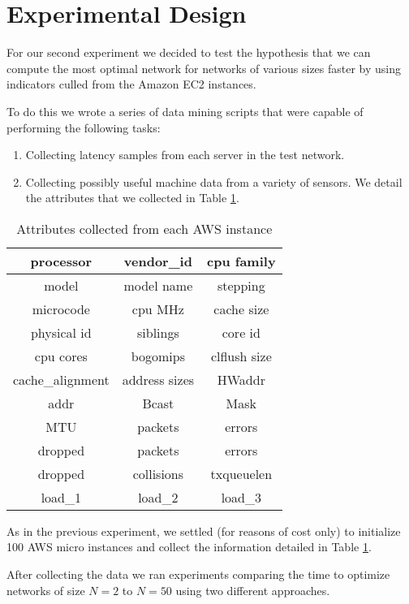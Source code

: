 \section{Experimental Design} \label{sec:experimental}
For our second experiment we decided to test the hypothesis that we can compute the most optimal network for networks of various sizes faster by using indicators culled from the Amazon EC2 instances.

To do this we wrote a series of data mining scripts that were capable of performing the following tasks:

\begin{enumerate}
\item Collecting latency samples from each server in the test network.
\item Collecting possibly useful machine data from a variety of sensors. We detail the attributes that we collected in Table \ref{table:dataset}.
\end{enumerate}

\begin{table}[h]
  \caption{Attributes collected from each AWS instance}
  \centering
  \begin{tabular}{ | c | c | c |}
    \hline
    processor   & vendor\_id & cpu family \\
    \hline
    model & model name & stepping \\
\hline
microcode & cpu MHz & cache size \\
\hline
physical id & siblings & core id \\
\hline
cpu cores & bogomips & clflush size \\
\hline
cache\_alignment & address sizes & HWaddr \\
\hline
addr & Bcast & Mask \\
\hline
MTU & packets & errors \\
\hline
dropped & packets & errors \\
\hline
dropped & collisions & txqueuelen \\
\hline
load\_1 & load\_2 & load\_3 \\
\hline
\end{tabular}
\label{table:dataset}
\end{table}

As in the previous experiment, we settled (for reasons of cost only) to initialize 100 AWS micro instances and collect the information detailed in Table \ref{table:dataset}.

After collecting the data we ran experiments comparing the time to optimize networks of size $N=2$ to $N=50$ using two different approaches.


